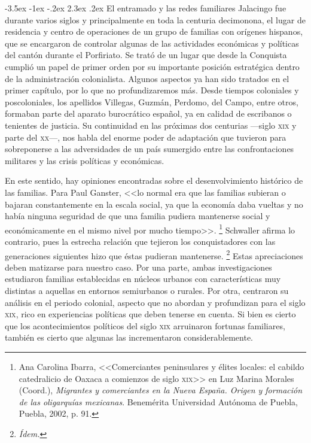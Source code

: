 \documentclass[14pt,twoside,final]{extbook} %
\makeatletter
\let\oldfootnote\footnote
\renewcommand\footnote[1]{%
\oldfootnote{\hspace{1mm}#1}}
\renewcommand\section{\@startsection {section}{1}{\z@}%
                                     {-3.5ex \@plus -1ex \@minus -.2ex}%
                                     {2.3ex \@plus .2ex}%
                                     {\normalfont\large\bfseries\sc}}
\makeatother
\begin{document}
\section{El entramado y las redes familiares}\label{sec:entramado-y-redes-familiares}
Jalacingo fue durante varios siglos y principalmente en toda la centuria decimonona, el lugar de residencia y centro de operaciones de un grupo de familias con orígenes hispanos, que se encargaron de controlar algunas de las actividades económicas y políticas del cantón durante el Porfiriato. Se trató de un lugar que desde la Conquista cumplió un papel de primer orden por su importante posición estratégica dentro de la administración colonialista. Algunos aspectos ya han sido tratados en el primer capítulo, por lo que no profundizaremos más. Desde tiempos coloniales y poscoloniales, los apellidos Villegas, Guzmán, Perdomo, del Campo, entre otros, formaban parte del aparato burocrático español, ya en calidad de escribanos o tenientes de justicia. Su continuidad en las próximas dos centurias ---siglo \textsc{xix} y parte del \textsc{xx}---, nos habla del enorme poder de adaptación que tuvieron para sobreponerse a las adversidades de un país sumergido entre las confrontaciones militares y las crisis políticas y económicas.

En este sentido, hay opiniones encontradas sobre el desenvolvimiento histórico de las familias. Para Paul Ganster, <<lo normal era que las familias subieran o bajaran constantemente en la escala social, ya que la economía daba vueltas y no había ninguna seguridad de que una familia pudiera mantenerse social y económicamente en el mismo nivel por mucho tiempo>>.\footnote{Ana Carolina Ibarra, <<Comerciantes peninsulares y élites locales: el cabildo catedralicio de Oaxaca a comienzos de siglo \textsc{xix}>> en Luz Marina Morales (Coord.), \emph{Migrantes y comerciantes en la Nueva España. Origen y formación de las oligarquías mexicanas}. Benemérita Universidad Autónoma de Puebla, Puebla, 2002, p. 91.} Schwaller afirma lo contrario, pues la estrecha relación que tejieron los conquistadores con las generaciones siguientes hizo que éstas pudieran mantenerse.\footnote{\em Ídem.} Estas apreciaciones deben matizarse para nuestro caso. Por una parte, ambas investigaciones estudiaron familias establecidas en núcleos urbanos con características muy distintas a aquellas en entornos semiurbanos o rurales. Por otra, centraron su análisis en el periodo colonial, aspecto que no abordan y profundizan para el siglo \textsc{xix}, rico en experiencias políticas que deben tenerse en cuenta. Si bien es cierto que los acontecimientos políticos del siglo \textsc{xix} arruinaron fortunas familiares, también es cierto que algunas las incrementaron considerablemente.
\end{document}
